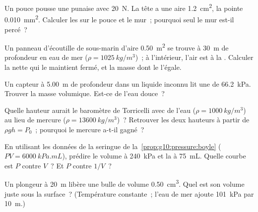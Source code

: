 \begin{exercise}[$\star\star$]\label{exo:g10:pressure:6}
Un pouce pousse une punaise avec \qty{20}{N}. La tête a une aire
\qty{1.2}{cm^2}, la pointe \qty{0.010}{mm^2}. Calculer les
 sur le pouce et le mur~; pourquoi seul le mur
est-il percé~?
\end{exercise}

\begin{exercise}[$\star\star$]\label{exo:g10:pressure:7}
Un panneau d'écoutille de sous-marin d'aire \qty{0.50}{m^2} se trouve
à \qty{30}{m} de profondeur en eau de mer
($\rho = \qty{1025}{kg/m^3}$)~; à l'intérieur, l'air est à la
. Calculer la
 nette qui le maintient fermé, et la masse dont le
 l'égale.
\end{exercise}

\begin{exercise}[$\star\star$]\label{exo:g10:pressure:8}
Un capteur à \qty{5.00}{m} de profondeur dans un liquide inconnu lit
une  de \qty{66.2}{kPa}. Trouver la masse
volumique. Est-ce de l'eau douce~?
\end{exercise}

\begin{exercise}[$\star\star$]\label{exo:g10:pressure:9}
Quelle hauteur aurait le baromètre de Torricelli avec de l'eau
($\rho = \qty{1000}{kg/m^3}$) au lieu de mercure
($\rho = \qty{13600}{kg/m^3}$)~? Retrouver les deux hauteurs à partir
de $\rho g h = P_0$~; pourquoi le mercure a-t-il gagné~?
\end{exercise}

\begin{exercise}[$\star\star$]\label{exo:g10:pressure:10}
En utilisant les données de la seringue
de la~\cref{prop:g10:pressure:boyle} ($PV = \qty{6000}{kPa.mL}$),
prédire le volume à \qty{240}{kPa} et la  à
\qty{75}{mL}. Quelle courbe est $P$ contre $V$~? Et $P$ contre
$1/V$~?
\end{exercise}

\begin{exercise}[$\star\star$]\label{exo:g10:pressure:11}
Un plongeur à \qty{20}{m} libère une bulle de volume \qty{0.50}{cm^3}.
Quel est son volume juste sous la surface~? (Température constante~;
l'eau de mer ajoute \qty{101}{kPa} par \qty{10}{m}.)
\end{exercise}

